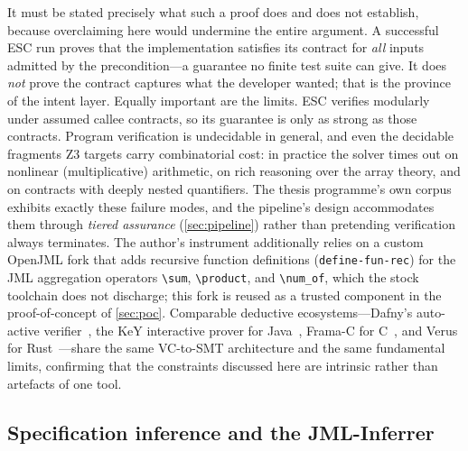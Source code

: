 It must be stated precisely what such a proof does and does not establish, because overclaiming here would undermine the entire argument. A successful ESC run proves that the implementation satisfies its contract for \emph{all} inputs admitted by the precondition---a guarantee no finite test suite can give. It does \emph{not} prove the contract captures what the developer wanted; that is the province of the intent layer. Equally important are the limits. ESC verifies modularly under assumed callee contracts, so its guarantee is only as strong as those contracts. Program verification is undecidable in general, and even the decidable fragments Z3 targets carry combinatorial cost: in practice the solver times out on nonlinear (multiplicative) arithmetic, on rich reasoning over the array theory, and on contracts with deeply nested quantifiers. The thesis programme's own corpus exhibits exactly these failure modes, and the pipeline's design accommodates them through \emph{tiered assurance} (\cref{sec:pipeline}) rather than pretending verification always terminates. The author's instrument additionally relies on a custom OpenJML fork that adds recursive function definitions (\verb|define-fun-rec|) for the JML aggregation operators \verb|\sum|, \verb|\product|, and \verb|\num_of|, which the stock toolchain does not discharge; this fork is reused as a trusted component in the proof-of-concept of \cref{sec:poc}. Comparable deductive ecosystems---Dafny's auto-active verifier~\cite{leino2010dafny}, the KeY interactive prover for Java~\cite{ahrendt2016key}, Frama-C for C~\cite{kirchner2015framac}, and Verus for Rust~\cite{lattuada2023verus}---share the same VC-to-SMT architecture and the same fundamental limits, confirming that the constraints discussed here are intrinsic rather than artefacts of one tool.

\subsection{Specification inference and the JML-Inferrer}\label{subsec:bg-inference}


